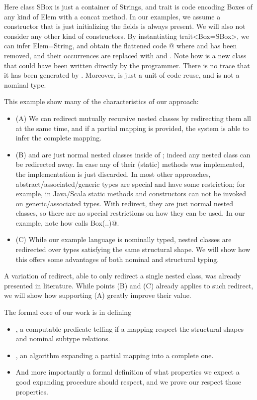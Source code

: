Here class SBox is just a container of Strings, and trait is code
encoding Boxes of any kind of Elem with a concat method.
In our examples, we assume a constructor that is just initializing the fields is always present.
We will also not consider any other kind of constructors.
By instantiating trait<Box=SBox>, we can infer Elem=String, and 
obtain the flattened code 
@
where \Q@Box@ and \Q@Elem@ has been removed, and their occurrences are replaced with \Q@SBox@ and \Q@String@.
Note how  \Q@Result@ is a new class
that could have been written directly by the programmer.
There is no trace that it has been generated by \Q@trait@.
Moreover, \Q@trait@ is just a unit of code reuse, and is not a nominal type.

This example show many of the characteristics of our approach:
\begin{itemize}
\item(A) We can redirect mutually recursive nested classes by redirecting them all at the same time, and
if a partial mapping is provided, the system is able to infer the complete mapping.

\item(B) \Q@Box@ and \Q@Elem@ are just normal nested classes inside of \Q@trait@; indeed
any nested class can be redirected away.
In case any of their (static) methods was implemented, the implementation is just discarded.
In most other approaches, abstract/associated/generic types are special and have some restriction;
for example, in Java/Scala static methods and constructors can not be invoked on generic/associated types.
With redirect, they are just normal nested classes, so there are no special restrictions on how they can be used.
In our example, note how \Q@merge@ calls \Q@new Box(..)@.

\item(C) 
While our example language is nominally typed, 
nested classes are redirected over types satisfying the same structural shape.
We will show how this offers some advantages of both nominal and structural typing.

\end{itemize}

A variation of redirect, able to only redirect a single nested class, was already presented in literature.
While points (B) and (C) already applies to such redirect,
we will show how supporting (A) greatly improve their value.

The formal core of our work is in defining 
\begin{itemize}
\item \Q@ValidRedirect@, a computable predicate telling if a mapping respect the structural shapes and
nominal subtype relations.
\item \Q@ChoseRedirect@, an algorithm expanding a partial mapping into a complete one.
\item And more importantly a formal definition of what properties we expect
a good expanding procedure should respect, and we prove our \Q@ChoseRedirect@
respect those properties.
\end{itemize}

